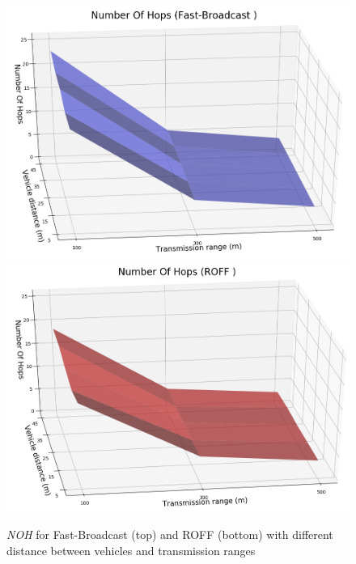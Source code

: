 		\begin{figure}[H]
			\centering
			\includegraphics[width=1.0\textwidth]{immagini/density/fb/noh}
			\includegraphics[width=1.0\textwidth]{immagini/density/roff/noh}
			\caption{\textit{NOH} for Fast-Broadcast (top) and ROFF (bottom) with different distance between vehicles and transmission ranges}
			\label{fig:density-noh}
		\end{figure}
	
